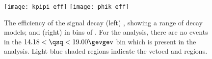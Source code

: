 \begin{figure}[t]
  \begin{center}
    \texttt{[image: kpipi\_eff]}
    \texttt{[image: phik\_eff]}
    \caption[Efficiency as a funciton of \qsq for \btokpipimumu and \btophikmumu]
    {
      The efficiency of the signal decay
      (left) \btokpipimumu, showing a range of decay models; and
      (right) \btophikmumu in bins of \qsq.
      For the \btophikmumu analysis, there are no events in the $14.18<\qsq<19.00\gevgev$ bin which
      is present in the \btokpipimumu analysis.
      Light blue shaded regions indicate the vetoed \jpsi and \psitwos regions.
    }
    \label{fig:hhh:effs}
  \end{center}
\end{figure}









